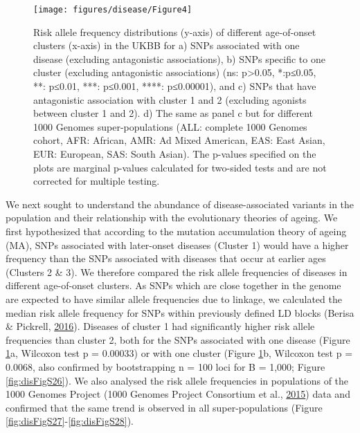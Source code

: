 \documentclass[12pt,twoside]{unicam}
\begin{document}
\begin{figure}

{\centering \texttt{[image: figures/disease/Figure4]} 

}

\caption[Risk allele frequency distributions of different age-of-onset clusters and SNPs specific to one disease, one age-of-onset cluster, or antagonistic between cluster 1 and 2.]{Risk allele frequency distributions (y-axis) of different age-of-onset clusters (x-axis) in the UKBB for a) SNPs associated with one disease (excluding antagonistic associations), b) SNPs specific to one cluster (excluding antagonistic associations) (ns: p>0.05, *:p≤0.05, **: p≤0.01, ***: p≤0.001, ****: p≤0.00001), and c) SNPs that have antagonistic association with cluster 1 and 2 (excluding agonists between cluster 1 and 2). d) The same as panel c but for different 1000 Genomes super-populations (ALL: complete 1000 Genomes cohort, AFR: African, AMR: Ad Mixed American, EAS: East Asian, EUR: European, SAS: South Asian). The p-values specified on the plots are marginal p-values calculated for two-sided tests and are not corrected for multiple testing.}\label{fig:disFig4}
\end{figure}

We next sought to understand the abundance of disease-associated variants in the population and their relationship with the evolutionary theories of ageing. We first hypothesized that according to the mutation accumulation theory of ageing (MA), SNPs associated with later-onset diseases (Cluster 1) would have a higher frequency than the SNPs associated with diseases that occur at earlier ages (Clusters 2 \& 3). We therefore compared the risk allele frequencies of diseases in different age-of-onset clusters. As SNPs which are close together in the genome are expected to have similar allele frequencies due to linkage, we calculated the median risk allele frequency for SNPs within previously defined LD blocks (Berisa \& Pickrell, \protect\hyperlink{ref-Berisa2016}{2016}). Diseases of cluster 1 had significantly higher risk allele frequencies than cluster 2, both for the SNPs associated with one disease (Figure \ref{fig:disFig4}a, Wilcoxon test p = 0.00033) or with one cluster (Figure \ref{fig:disFig4}b, Wilcoxon test p = 0.0068, also confirmed by bootstrapping n = 100 loci for B = 1,000; Figure \ref{fig:disFigS26}). We also analysed the risk allele frequencies in populations of the 1000 Genomes Project (1000 Genomes Project Consortium et al., \protect\hyperlink{ref-1000_Genomes_Project_Consortium2015}{2015}) data and confirmed that the same trend is observed in all super-populations (Figure \ref{fig:disFigS27}-\ref{fig:disFigS28}).
\end{document}

